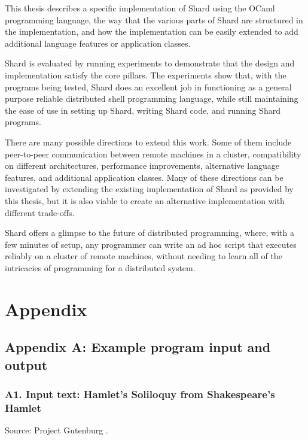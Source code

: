 \documentclass[oneside]{report}
\newcommand{\todoi}[1]{\todo[inline, color=blue!20]{TODO: {#1}}}
\begin{document}
This thesis describes a specific implementation of Shard using the OCaml programming language, the way that the various parts of Shard are structured in the implementation, and how the implementation can be easily extended to add additional language features or application classes.

Shard is evaluated by running experiments to demonstrate that the design and implementation satisfy the core pillars. The experiments show that, with the programs being tested, Shard does an excellent job in functioning as a general purpose reliable distributed shell programming language, while still maintaining the ease of use in setting up Shard, writing Shard code, and running Shard programs.

There are many possible directions to extend this work.
Some of them include peer-to-peer communication between remote machines in a cluster, compatibility on different architectures, performance improvements, alternative language features, and additional application classes.
Many of these directions can be investigated by extending the existing implementation of Shard as provided by this thesis, but it is also viable to create an alternative implementation with different trade-offs.


Shard offers a glimpse to the future of distributed programming, where, with a few minutes of setup, any programmer can write an ad hoc script that executes reliably on a cluster of remote machines, without needing to learn all of the intricacies of programming for a distributed system.


\chapter{Appendix}
\section{Appendix A: Example program input and output}

\subsection{A1. Input text: Hamlet's Soliloquy from Shakespeare's Hamlet}

Source: Project Gutenburg \cite{hamlet}.
\end{document}
